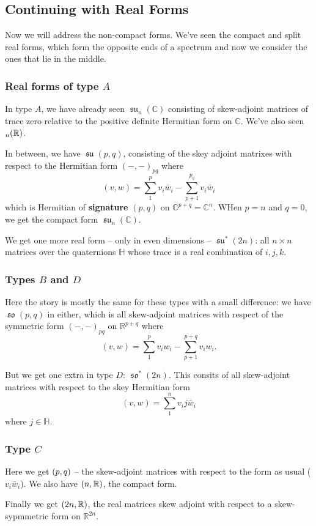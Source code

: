 \documentclass[12pt]{article}
\theoremstyle{nonumberbreak}
\theoremstyle{changebreak}
\theoremstyle{nonumberbreak}
\theoremstyle{change}
\newcommand*{\R}{
\mathbb{R}
}
\newcommand*{\C}{
\mathbb{C}
}
\let\sl\relax
\DeclareMathOperator{\sl}{\mathfrak{sl}}
\DeclareMathOperator{\so}{\mathfrak{so}}
\DeclareMathOperator{\su}{\mathfrak{su}}
\let\sp\relax
\DeclareMathOperator{\sp}{\mathfrak{sp}}
\begin{document}
\subsection{Continuing with Real Forms}
Now we will address the non-compact forms. We've seen the compact and split real forms, which form 
the opposite ends of a spectrum and now we consider the ones that lie in the middle. 

\subsubsection{Real forms of type $A$}
In type $A$, we have already
seen $\su_n(\C)$ consisting of skew-adjoint matrices of trace zero relative to the positive definite Hermitian form on $\C$.
We've also seen $\sl_n(\R)$.

In between, we have $\su(p,q)$, consisting of the skey adjoint matrixes with respect to the Hermitian form $(-,-)_{pq}$ where
\[(v,w)=\sum_1^pv_i\bar w_i-\sum_{p+1}^{p_q}v_i\bar w_i\]
which is Hermitian of \textbf{signature} $(p,q)$ on $\C^{p+q}=\C^n$. WHen $p=n$ and $q=0$, we get the compact form $\su_n(\C)$.

We get one more real form -- only in even dimensions -- $\su^*(2n)$: all $n\times n$ matrices over the quaternions $\mathbb{H}$ whose trace is a real
combination of $i,j,k$.

\subsubsection{Types $B$ and $D$}
Here the story is mostly the same for these types with a small difference: we have $\so(p,q)$
in either, which is all skew-adjoint matrices with respect of the symmetric form $(-,-)_{pq}$
on $\R^{p+q}$ where
\[(v,w)=\sum_1^pv_iw_i-\sum_{p+1}^{p+q}v_iw_i.\]

But we get one extra in type $D$: $\so^*(2n)$. This consits of all skew-adjoint matrices with respect to the skey Hermitian form
\[(v,w)=\sum_1^n v_ij\bar w_i\]
where $j\in\mathbb{H}$.

\subsubsection{Type $C$}
Here we get $\sp(p,q)$ -- the skew-adjoint matrices with respect to the form as usual ($v_i\bar w_i$).
We also have $\sp(n,\R)$, the compact form.

Finally we get $\sp(2n,\R)$, the real matrices skew adjoint with respect to a skew-sypmmetric form on $\R^{2n}$.
\end{document}
